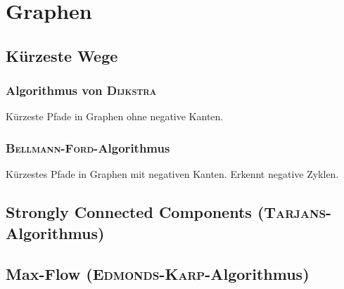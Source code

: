 \section{Graphen}

\subsection{Kürzeste Wege}

\subsubsection{Algorithmus von \textsc{Dijkstra}}
Kürzeste Pfade in Graphen ohne negative Kanten.


\subsubsection{\textsc{Bellmann-Ford}-Algorithmus}
Kürzestes Pfade in Graphen mit negativen Kanten. Erkennt negative Zyklen.


\subsection{Strongly Connected Components (\textsc{Tarjans}-Algorithmus)}


\subsection{Max-Flow (\textsc{Edmonds-Karp}-Algorithmus)}
